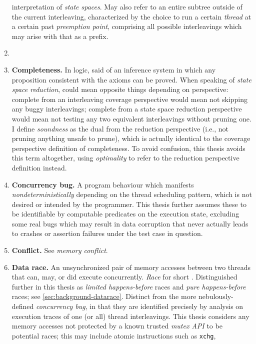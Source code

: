 \begin{enumerate}
		interpretation of {\em state spaces}.
		May also refer to an entire subtree outside of the current interleaving,
		characterized by the choice to run a certain {\em thread} at a certain past {\em preemption point},
		comprising all possible interleavings which may arise with that as a prefix.
	\item {}
	\item {\bf Completeness.}
		In logic, said of an inference system in which any proposition consistent with the axioms can be proved.
		When speaking of {\em state space reduction},
		could mean opposite things depending on perspective:
		complete from an interleaving coverage perspective would mean not skipping any buggy interleavings;
		complete from a state space reduction perspective would mean not testing any two equivalent interleavings
		without pruning one.
		I define {\em soundness} as the dual from the reduction perspective (i.e., not pruning anything unsafe to prune),
		which is actually identical to the coverage perspective definition of completeness.
		To avoid confusion, this thesis avoids this term altogether,
		using {\em optimality} to refer to the reduction perspective definition instead.
	\item {\bf Concurrency bug.}
		A program behaviour which manifests {\em nondeterministically} depending on the thread scheduling pattern,
		which is not desired or intended by the programmer.
		This thesis further assumes these to be identifiable by computable predicates on the execution state,
		excluding some real bugs which may result in data corruption that never actually leads to crashes or assertion
		failures under the test case in question.
	\item {\bf Conflict.} See {\em memory conflict}.
	\item {\bf Data race.}
		An unsynchronized pair of memory accesses between two threads that can, may, or did execute concurrently.
		{\em Race} for short .
		Distinguished further in this thesis as {\em limited happens-before} races and {\em pure happens-before} races;
		see \cref{sec:background-datarace}.
		Distinct from the more nebulously-defined {\em concurrency bug},
		in that they are identified precisely by analysis on execution traces of one (or all) thread interleavings.
		This thesis considers any memory accesses not protected by a known trusted {\em mutex API}
		to be potential races;
		this may include atomic instructions such as {\tt xchg},

\end{enumerate}
